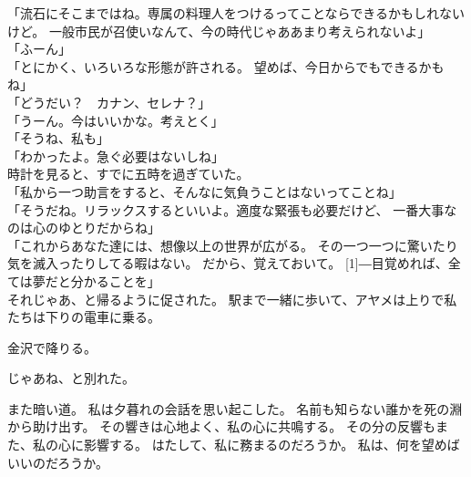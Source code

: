 \documentclass[../IHMain]{subfiles}
\begin{document}
「流石にそこまではね。専属の料理人をつけるってことならできるかもしれないけど。
一般市民が召使いなんて、今の時代じゃああまり考えられないよ」\\
「ふーん」\\
「とにかく、いろいろな形態が許される。
望めば、今日からでもできるかもね」\\
「どうだい？　カナン、セレナ？」\\
「うーん。今はいいかな。考えとく」\\
「そうね、私も」\\
「わかったよ。急ぐ必要はないしね」\\
時計を見ると、すでに五時を過ぎていた。\\
「私から一つ助言をすると、そんなに気負うことはないってことね」\\
「そうだね。リラックスするといいよ。適度な緊張も必要だけど、
一番大事なのは心のゆとりだからね」\\
「これからあなた達には、想像以上の世界が広がる。
その一つ一つに驚いたり気を滅入ったりしてる暇はない。
だから、覚えておいて。
\scalebox{3}[1]{―}目覚めれば、全ては夢だと分かることを」\\


それじゃあ、と帰るように促された。
駅まで一緒に歩いて、アヤメは上りで私たちは下りの電車に乗る。

金沢で降りる。

じゃあね、と別れた。

また暗い道。
私は夕暮れの会話を思い起こした。
名前も知らない誰かを死の淵から助け出す。
その響きは心地よく、私の心に共鳴する。
その分の反響もまた、私の心に影響する。
はたして、私に務まるのだろうか。
私は、何を望めばいいのだろうか。
\end{document}
